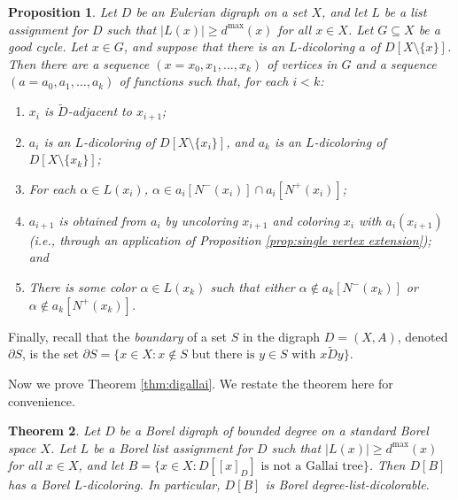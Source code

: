 \documentclass[psamsfonts]{amsart}
\newtheorem{thm}{Theorem}[section]
\newtheorem{prop}[thm]{Proposition}
\theoremstyle{definition}
\theoremstyle{remark}
\numberwithin{equation}{section}
\begin{document}
\begin{prop}
    \cite[Lemma~2.5]{hm2011}
    \label{prop:extending to good cycle}
    Let $D$ be an Eulerian digraph on a set $X$, and let $L$ be a list assignment for $D$ such that $\vert L(x) \vert \geq d^{\max}(x)$ for all $x \in X$. Let $G \subseteq X$ be a good cycle. Let $x \in G$, and suppose that there is an $L$-dicoloring $a$ of $D[X \setminus \{x\}]$. Then there are a sequence $(x = x_0, x_1, \dots, x_k)$ of vertices in $G$ and a sequence $(a = a_0, a_1, \dots, a_k)$ of functions such that, for each $i < k$:
    \begin{enumerate}
        \item $x_i$ is $\tilde{D}$-adjacent to $x_{i + 1}$;
        \item $a_i$ is an $L$-dicoloring of $D[X \setminus \{x_i\}]$, and $a_k$ is an $L$-dicoloring of $D[X \setminus \{x_k\}]$;
        \item For each $\alpha \in L(x_i)$, $\alpha \in a_i[N^-(x_i)] \cap a_i[N^+(x_i)]$;
        \item $a_{i + 1}$ is obtained from $a_i$ by uncoloring $x_{i + 1}$ and coloring $x_i$ with $a_i(x_{i + 1})$ (i.e., through an application of Proposition \ref{prop:single vertex extension}); and
        \item There is some color $\alpha \in L(x_k)$ such that either $\alpha \notin a_k[N^-(x_k)]$ or $\alpha \notin a_k[N^+(x_k)]$.
    \end{enumerate}
\end{prop}

Finally, recall that the {\it boundary} of a set $S$ in the digraph $D = (X, A)$, denoted $\partial S$, is the set $\partial S = \{x \in X : x \notin S \text{ but there is $y \in S$ with $x \mathrel{\tilde{D}} y$} \}$.

Now we prove Theorem \ref{thm:digallai}. We restate the theorem here for convenience.

\begin{thm}
\label{thm:no gallai}
    Let $D$ be a Borel digraph of bounded degree on a standard Borel space $X$. Let $L$ be a Borel list assignment for $D$ such that $\vert L(x) \vert \geq d^{\max}(x)$ for all $x \in X$, and let $B = \{x \in X : D[[x]_D] \text{ is not a Gallai tree} \}$. Then $D[B]$ has a Borel $L$-dicoloring. In particular, $D[B]$ is Borel degree-list-dicolorable.
\end{thm}
\end{document}
